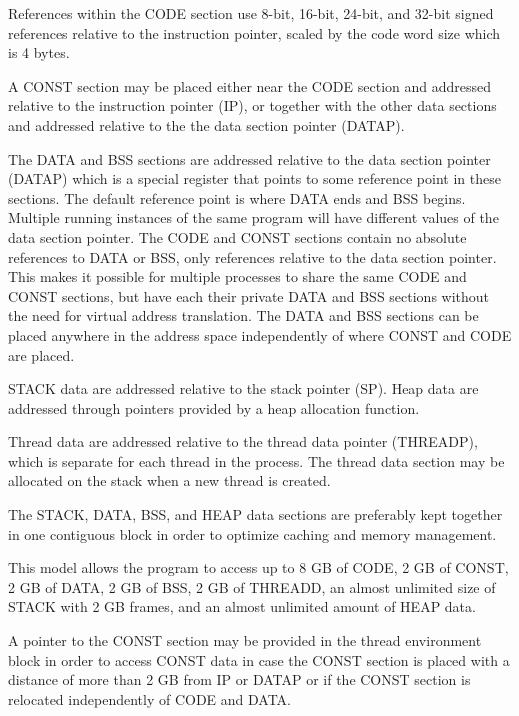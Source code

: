 \documentclass[forwardcom.tex]{subfiles}
\begin{document}
References within the CODE section use 8-bit, 16-bit, 24-bit, and 32-bit signed references relative to the instruction pointer, scaled by the code word size which is 4 bytes. 
\vv

A CONST section may be placed either near the CODE section and addressed relative to the instruction pointer (IP), or together with the other data sections and addressed relative to the the data section pointer (DATAP).
\vv

The DATA and BSS sections are addressed relative to the data section pointer (DATAP) which is a special register that points to some reference point in these sections. The default reference point is where DATA ends and BSS begins. Multiple running instances of the same program will have different values of the data section pointer. The CODE and CONST sections contain no absolute references to DATA or BSS, only references relative to the data section pointer. This makes it possible for multiple processes to share the same CODE and CONST sections, but have each their private DATA and BSS sections without the need for virtual address translation. The DATA and BSS sections can be placed anywhere in the address space independently of where CONST and CODE are placed.
\vv

STACK data are addressed relative to the stack pointer (SP). Heap data are addressed through pointers provided by a heap allocation function. 
\vv

Thread data are addressed relative to the thread data pointer (THREADP), which is separate for each thread in the process. The thread data section may be allocated on the stack when a new thread is created.
\vv

The STACK, DATA, BSS, and HEAP data sections are preferably kept together in one contiguous block in order to optimize caching and memory management. 
\vv

This model allows the program to access up to 8 GB of CODE, 2 GB of CONST, 2 GB of DATA, 2 GB of BSS, 2 GB of THREADD, an almost unlimited size of STACK with 2 GB frames, and an almost unlimited amount of HEAP data. 
\vv

A pointer to the CONST section may be provided in the thread environment block in order to access CONST data in case  the CONST section is placed with a distance of more than 2 GB from IP or DATAP or if the CONST section is relocated independently of CODE and DATA.
\vv
\end{document}
